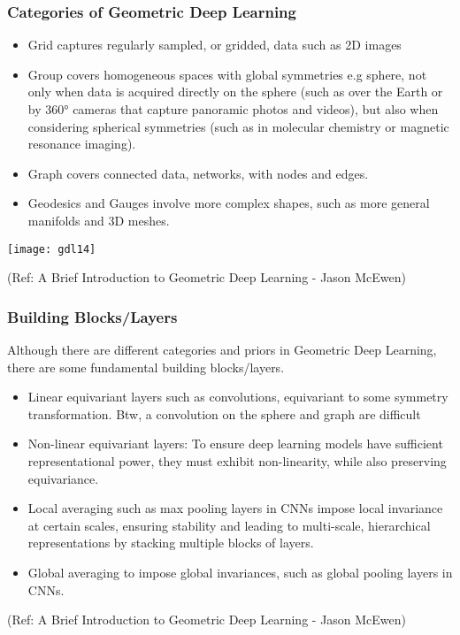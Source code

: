\begin{frame}[fragile]\frametitle{Categories of Geometric Deep Learning}


\begin{itemize}
\item Grid captures regularly sampled, or gridded, data such as 2D images
\item Group covers homogeneous spaces with global symmetries e.g sphere, not only when data is acquired directly on the sphere (such as over the Earth or by 360° cameras that capture panoramic photos and videos), but also when considering spherical symmetries (such as in molecular chemistry or magnetic resonance imaging). 
\item Graph covers connected data, networks, with nodes and edges.
\item Geodesics and Gauges involve more complex shapes, such as more general manifolds and 3D meshes.
\end{itemize}

\begin{center}
\texttt{[image: gdl14]}
\end{center}

{\tiny (Ref: A Brief Introduction to Geometric Deep Learning - Jason McEwen)}

\end{frame}

\begin{frame}[fragile]\frametitle{Building Blocks/Layers}

Although there are different categories and priors in Geometric Deep Learning, there are some fundamental building blocks/layers.
\begin{itemize}
\item Linear equivariant layers such as convolutions, equivariant to some symmetry transformation. Btw, a convolution on the sphere and graph are difficult
\item Non-linear equivariant layers: To ensure deep learning models have sufficient representational power, they must exhibit non-linearity, while also preserving equivariance.
\item Local averaging such as max pooling layers in CNNs impose local invariance at certain scales, ensuring stability and leading to multi-scale, hierarchical representations by stacking multiple blocks of layers.
\item Global averaging to impose global invariances, such as global pooling layers in CNNs.
\end{itemize}


{\tiny (Ref: A Brief Introduction to Geometric Deep Learning - Jason McEwen)}

\end{frame}

